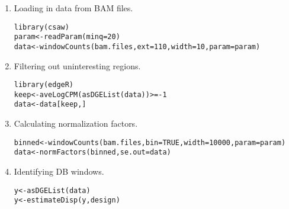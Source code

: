 \documentclass{report}\usepackage[]{graphicx}\usepackage[usenames,dvipsnames]{color}
\newcommand{\hlnum}[1]{\textcolor[rgb]{0.816,0.125,0.439}{#1}}%
\newcommand{\hlopt}[1]{\textcolor[rgb]{0,0,0}{#1}}%
\newcommand{\hlstd}[1]{\textcolor[rgb]{0.251,0.251,0.251}{#1}}%
\newcommand{\hlkwb}[1]{\textcolor[rgb]{0,0,0}{#1}}%
\newcommand{\hlkwc}[1]{\textcolor[rgb]{0.251,0.251,0.251}{#1}}%
\newcommand{\hlkwd}[1]{\textcolor[rgb]{0.878,0.439,0.125}{#1}}%
\newenvironment{knitrout}{}{} %
\begin{document}
\begin{enumerate}
\item Loading in data from BAM files.
\begin{knitrout}
\color{fgcolor}\begin{kframe}
\begin{alltt}
\hlkwd{library}\hlstd{(csaw)}
\hlstd{param} \hlkwb{<-} \hlkwd{readParam}\hlstd{(}\hlkwc{minq}\hlstd{=}\hlnum{20}\hlstd{)}
\hlstd{data} \hlkwb{<-} \hlkwd{windowCounts}\hlstd{(bam.files,} \hlkwc{ext}\hlstd{=}\hlnum{110}\hlstd{,} \hlkwc{width}\hlstd{=}\hlnum{10}\hlstd{,} \hlkwc{param}\hlstd{=param)}
\end{alltt}
\end{kframe}
\end{knitrout}
\item Filtering out uninteresting regions.
\begin{knitrout}
\color{fgcolor}\begin{kframe}
\begin{alltt}
\hlkwd{library}\hlstd{(edgeR)}
\hlstd{keep} \hlkwb{<-} \hlkwd{aveLogCPM}\hlstd{(}\hlkwd{asDGEList}\hlstd{(data))} \hlopt{>= -}\hlnum{1}
\hlstd{data} \hlkwb{<-} \hlstd{data[keep,]}
\end{alltt}
\end{kframe}
\end{knitrout}
\item Calculating normalization factors.
\begin{knitrout}
\color{fgcolor}\begin{kframe}
\begin{alltt}
\hlstd{binned} \hlkwb{<-} \hlkwd{windowCounts}\hlstd{(bam.files,} \hlkwc{bin}\hlstd{=}\hlnum{TRUE}\hlstd{,} \hlkwc{width}\hlstd{=}\hlnum{10000}\hlstd{,} \hlkwc{param}\hlstd{=param)}
\hlstd{data} \hlkwb{<-} \hlkwd{normFactors}\hlstd{(binned,} \hlkwc{se.out}\hlstd{=data)}
\end{alltt}
\end{kframe}
\end{knitrout}
\item Identifying DB windows.
\begin{knitrout}
\color{fgcolor}\begin{kframe}
\begin{alltt}
\hlstd{y} \hlkwb{<-} \hlkwd{asDGEList}\hlstd{(data)}
\hlstd{y} \hlkwb{<-} \hlkwd{estimateDisp}\hlstd{(y, design)}

\end{alltt}
\end{kframe}
\end{knitrout}
\end{enumerate}
\end{document}
